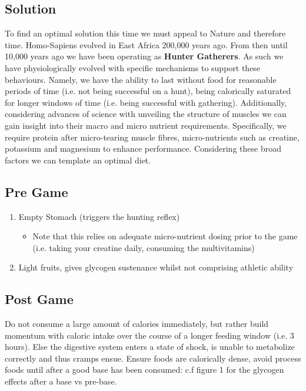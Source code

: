 \documentclass{article}
\begin{document}
\begin{answerbox}
    \section*{Solution}
    To find an optimal solution this time we must appeal to Nature and therefore time. Homo-Sapiens evolved in East Africa 200,000 years ago. From then until 10,000 years ago we have been operating as \textbf{Hunter Gatherers}. As such we have physiologically evolved with specific mechanisms to support these behaviours. Namely, we have the ability to last without food for reasonable periods of time (i.e. not being successful on a hunt), being calorically saturated for longer windows of time (i.e. being successful with gathering). Additionally, considering advances of science with unveiling the structure of muscles we can gain insight into their macro and micro nutrient requirements. Specifically, we require protein after micro-tearing muscle fibres, micro-nutrients such as creatine, potassium and magnesium to enhance performance. Considering these broad factors we can template an optimal diet.

    \begin{multicols}{2}
        \subsection*{Pre Game}
            \begin{enumerate}
                \item Empty Stomach (triggers the hunting reflex)
                    \begin{itemize}
                        \item Note that this relies on adequate micro-nutrient dosing prior to the game (i.e. taking your creatine daily, consuming the multivitamins)
                    \end{itemize}
                \item Light fruits, gives glycogen sustenance whilst not comprising athletic ability
            \end{enumerate}
        \subsection*{Post Game}
            Do not consume a large amount of calories immediately, but rather build momentum with caloric intake over the course of a longer feeding window (i.e. 3 hours). Else the digestive system enters a state of shock, is unable to metabolize correctly and thus cramps ensue. Ensure foods are calorically dense, avoid process foods until after a good base has been consumed: c.f figure 1 for the glycogen effects after a base vs pre-base. 
    \end{multicols}


\end{answerbox}
\end{document}
